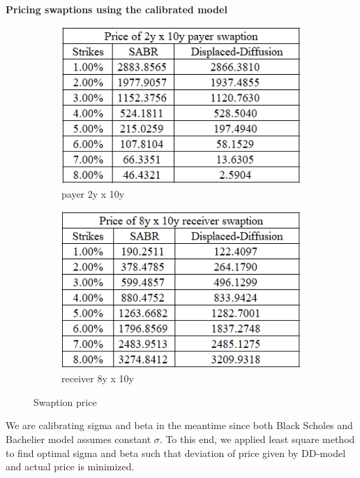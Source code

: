 \documentclass{article}
\begin{document}
\noindent \textbf{Pricing swaptions using the calibrated model}\\
\begin{figure}[h]
	\centering
	\begin{subfigure}{.5\textwidth}
		\centering
		\includegraphics[width=0.9\linewidth]{./images/Payer.png}
		\caption{payer 2y x 10y}
		\label{fig:sub1}
	\end{subfigure}%
	\begin{subfigure}{.5\textwidth}
		\centering
		\includegraphics[width=0.91\linewidth]{./images/Receiver.png}
		\caption{receiver 8y x 10y}
		\label{fig:sub2}
	\end{subfigure}
	\caption{Swaption price}
	\label{fig:test}
\end{figure}

\noindent We are calibrating sigma and beta in the meantime since both Black Scholes and Bachelier model assumes constant $\sigma$. To this end, we applied least square method to find optimal sigma and beta such that deviation of price given by DD-model and actual price is minimized. \\
\end{document}
